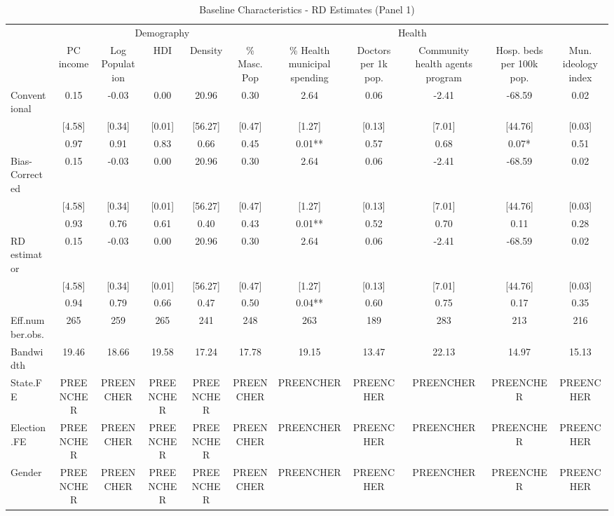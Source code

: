 \begin{table}[!t]
\caption{Baseline Characteristics - RD Estimates (Panel 1)} 
\fontsize{12.0pt}{14.4pt}\selectfont
\begin{tabular*}{\linewidth}{@{\extracolsep{\fill}}lcccccccccc}
\toprule
 & \multicolumn{5}{c}{Demography} & \multicolumn{4}{c}{Health} &  \\ 
\cmidrule(lr){2-6} \cmidrule(lr){7-10}
  & PC income & Log Population & HDI & Density & \% Masc. Pop & \% Health municipal spending & Doctors per 1k pop. & Community health agents program & Hosp. beds per 100k pop. & Mun. ideology index \\ 
\midrule\addlinespace[2.5pt]
Conventional & 0.15 & -0.03 & 0.00 & 20.96 & 0.30 & 2.64 & 0.06 & -2.41 & -68.59 & 0.02 \\ 
 & [4.58] & [0.34] & [0.01] & [56.27] & [0.47] & [1.27] & [0.13] & [7.01] & [44.76] & [0.03] \\ 
 & 0.97 & 0.91 & 0.83 & 0.66 & 0.45 & 0.01** & 0.57 & 0.68 & 0.07* & 0.51 \\ 
Bias-Corrected & 0.15 & -0.03 & 0.00 & 20.96 & 0.30 & 2.64 & 0.06 & -2.41 & -68.59 & 0.02 \\ 
 & [4.58] & [0.34] & [0.01] & [56.27] & [0.47] & [1.27] & [0.13] & [7.01] & [44.76] & [0.03] \\ 
 & 0.93 & 0.76 & 0.61 & 0.40 & 0.43 & 0.01** & 0.52 & 0.70 & 0.11 & 0.28 \\ 
RD estimator & 0.15 & -0.03 & 0.00 & 20.96 & 0.30 & 2.64 & 0.06 & -2.41 & -68.59 & 0.02 \\ 
 & [4.58] & [0.34] & [0.01] & [56.27] & [0.47] & [1.27] & [0.13] & [7.01] & [44.76] & [0.03] \\ 
{} & {0.94} & {0.79} & {0.66} & {0.47} & {0.50} & {0.04**} & {0.60} & {0.75} & {0.17} & {0.35} \\ 
Eff.number.obs. & 265 & 259 & 265 & 241 & 248 & 263 & 189 & 283 & 213 & 216 \\ 
Bandwidth & 19.46 & 18.66 & 19.58 & 17.24 & 17.78 & 19.15 & 13.47 & 22.13 & 14.97 & 15.13 \\ 
State.FE & PREENCHER & PREENCHER & PREENCHER & PREENCHER & PREENCHER & PREENCHER & PREENCHER & PREENCHER & PREENCHER & PREENCHER \\ 
Election.FE & PREENCHER & PREENCHER & PREENCHER & PREENCHER & PREENCHER & PREENCHER & PREENCHER & PREENCHER & PREENCHER & PREENCHER \\ 
Gender & PREENCHER & PREENCHER & PREENCHER & PREENCHER & PREENCHER & PREENCHER & PREENCHER & PREENCHER & PREENCHER & PREENCHER \\ 
\bottomrule
\end{tabular*}
\end{table}

